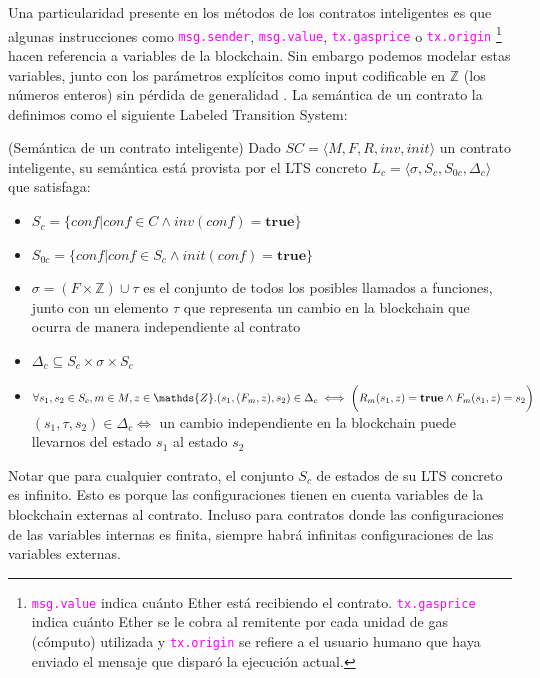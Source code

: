 Una particularidad presente en los métodos de los contratos inteligentes es que algunas instrucciones como \textcolor{magenta}{\texttt{msg.sender}}, \textcolor{magenta}{\texttt{msg.value}}, \textcolor{magenta}{\texttt{tx.gasprice}} o \textcolor{magenta}{\texttt{tx.origin}}
\footnote{\textcolor{magenta}{\texttt{msg.value}} indica cuánto Ether está recibiendo el contrato. \textcolor{magenta}{\texttt{tx.gasprice}} indica cuánto Ether se le cobra al remitente por cada unidad de gas (cómputo) utilizada y \textcolor{magenta}{\texttt{tx.origin}} se refiere a el usuario humano que haya enviado el mensaje que disparó la ejecución actual.} hacen referencia a variables de la blockchain.
Sin embargo podemos modelar estas variables, junto con los parámetros explícitos como input codificable en $\mathds{Z}$ (los números enteros) sin pérdida de generalidad \cite{de-caso-epa}.
La semántica de un contrato la definimos como el siguiente Labeled Transition System:

\begin{definition}\label{definicion-lts}(Semántica de un contrato inteligente)
    Dado $SC = \langle M, F, R, inv, init \rangle$ un contrato inteligente, su semántica está provista por el LTS concreto $L_c = \langle \sigma , S_c, S_{0c}, \Delta _c \rangle$ que satisfaga:
    \begin{itemize}
        \item $S_c = \{conf | conf \in C \land inv(conf) = \textbf{true}\}$
        \item $S_{0c} = \{conf | conf \in S_c \land init(conf) = \textbf{true}\}$
        \item $\sigma = (F \times \mathds{Z}) \cup \tau$ es el conjunto de todos los posibles llamados a funciones, junto con un elemento $\tau$ que representa un cambio en la blockchain que ocurra de manera independiente al contrato
        \item $\Delta _c \subseteq S_c \times \sigma \times S_c$
        \item $\forall s_1,s_2 \in S_c, m \in M, z \in \mathds{Z} . \\ (s_1,(F_m,z),s_2) \in \Delta _c \iff \bigg( R_m(s_1,z) = \textbf{true} \land   F_m(s_1,z) = s_2 \bigg)$ \\
              $(s_1,\tau,s_2) \in \Delta _c \iff$ un cambio independiente en la blockchain puede llevarnos del estado $s_1$ al estado $s_2$
    \end{itemize}
\end{definition}
Notar que para cualquier contrato, el conjunto $S_c$ de estados de su LTS concreto es infinito.
Esto es porque las configuraciones tienen en cuenta variables de la blockchain externas al contrato.
Incluso para contratos donde las configuraciones de las variables internas es finita, siempre habrá infinitas configuraciones de las variables externas.
\\

